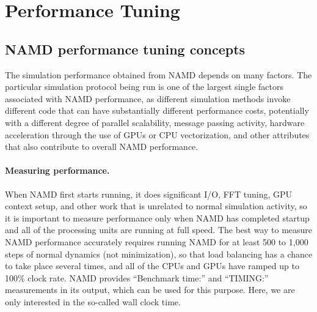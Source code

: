 \section{Performance Tuning}
\label{section:performance}

\subsection{NAMD performance tuning concepts}
The simulation performance obtained from NAMD depends on many factors.
The particular simulation protocol being run is one of the largest
single factors associated with NAMD performance, as different simulation
methods invoke different code that can have substantially different 
performance costs, potentially with a different degree of parallel
scalability, message passing activity, hardware acceleration through
the use of GPUs or CPU vectorization,
and other attributes that also contribute to overall NAMD performance.

\paragraph{Measuring performance.}
When NAMD first starts running, it does significant I/O, FFT tuning,
GPU context setup, and other work that is unrelated to normal 
simulation activity, so it is important to measure performance only
when NAMD has completed startup and all of the processing units are
running at full speed.
The best way to measure NAMD performance accurately requires running
NAMD for at least 500 to 1,000 steps of normal dynamics (not minimization),
so that load balancing has a chance to 
take place several times, and all of the CPUs and GPUs have ramped up
to 100\% clock rate.  NAMD provides ``Benchmark time:'' and ``TIMING:''
measurements in its output, which can be used for this purpose.  
Here, we are only interested in the so-called wall clock time.

